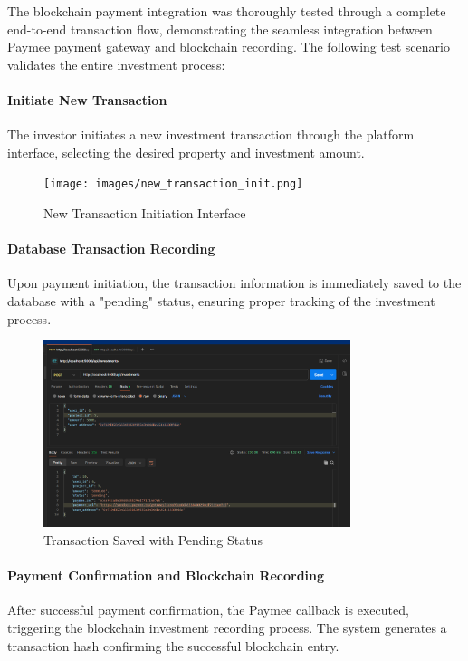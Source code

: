 The blockchain payment integration was thoroughly tested through a complete end-to-end transaction flow, demonstrating the seamless integration between Paymee payment gateway and blockchain recording. The following test scenario validates the entire investment process:

\paragraph{ Initiate New Transaction}
The investor initiates a new investment transaction through the platform interface, selecting the desired property and investment amount.

\begin{figure}[htbp]
    \centering
    \texttt{[image: images/new\_transaction\_init.png]}
    \caption{New Transaction Initiation Interface}
    \label{fig:new-transaction-init}
\end{figure}


\paragraph{ Database Transaction Recording}
Upon payment initiation, the transaction information is immediately saved to the database with a "pending" status, ensuring proper tracking of the investment process.

\begin{figure}[htbp]
    \centering
    \includegraphics[width=0.8\textwidth]{images/transaction_pending_status.png}
    \caption{Transaction Saved with Pending Status}
    \label{fig:transaction-pending-status}
\end{figure}

\newpage

\paragraph{Payment Confirmation and Blockchain Recording}
After successful payment confirmation, the Paymee callback is executed, triggering the blockchain investment recording process. The system generates a transaction hash confirming the successful blockchain entry.

